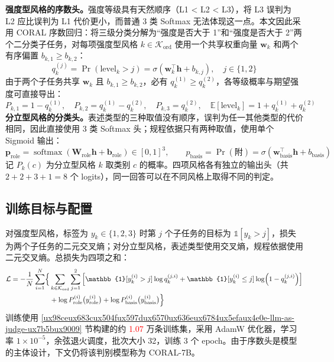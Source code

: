 \documentclass[fontset=fandol,type=master,campus=shenzhen,etitleauto=true]{hithesisbook}
\newcommand{\rev}[1]{\textcolor{red}{#1}}
\begin{document}
\textbf{强度型风格的序数头。}强度等级具有天然顺序（L1 < L2 < L3），将 L3 误判为 L2 应比误判为 L1 代价更小，而普通 3 类 Softmax 无法体现这一点。本文因此采用 CORAL 序数回归\cite{ref86}：将三级分类分解为“强度是否大于 1”和“强度是否大于 2”两个二分类子任务，对每项强度型风格 $k \in \mathcal{K}_{\text{ord}}$ 使用一个共享权重向量 $\mathbf{w}_k$ 和两个有序偏置 $b_{k,1} \ge b_{k,2}$：
\begin{equation}
q_k^{(j)} = \Pr(\text{level}_k > j) = \sigma\!\left(\mathbf{w}_k^{\top}\mathbf{h} + b_{k,j}\right), \quad j \in \{1, 2\}
\end{equation}
由于两个子任务共享 $\mathbf{w}_k$ 且 $b_{k,1} \ge b_{k,2}$，必有 $q_k^{(1)} \ge q_k^{(2)}$，各等级概率与期望强度可直接导出：
\begin{equation}
P_{k,1} = 1 - q_k^{(1)}, \quad P_{k,2} = q_k^{(1)} - q_k^{(2)}, \quad P_{k,3} = q_k^{(2)}, \quad \mathbb{E}[\text{level}_k] = 1 + q_k^{(1)} + q_k^{(2)}
\end{equation}
\textbf{分立型风格的分类头。}表述类型的三种取值没有顺序，误判为任一其他类型的代价相同，因此直接使用 3 类 Softmax 头；规程依据只有两种取值，使用单个 Sigmoid 输出：
\begin{equation}
\mathbf{p}_{\text{role}} = \operatorname{softmax}\!\left(\mathbf{W}_{\text{role}}\mathbf{h} + \mathbf{b}_{\text{role}}\right) \in [0,1]^{3}, \qquad p_{\text{basis}} = \Pr(\text{附}) = \sigma\!\left(\mathbf{w}_{\text{basis}}^{\top}\mathbf{h} + b_{\text{basis}}\right)
\end{equation}
记 $P_k(c)$ 为分立型风格 $k$ 取类别 $c$ 的概率。四项风格各有独立的输出头（共 $2 + 2 + 3 + 1 = 8$ 个 logits），同一回答可以在不同风格上取得不同的判定。

\subsection{训练目标与配置}\label{ux8badux7ec3ux76eeux6807ux4e0eux4f18ux5316ux914dux7f6e-1}

对强度型风格，标签为 $y_k \in \{1,2,3\}$ 时第 $j$ 个子任务的目标为 $\mathbb{1}[y_k > j]$，损失为两个子任务的二元交叉熵；对分立型风格，表述类型使用交叉熵，规程依据使用二元交叉熵。总损失为四项之和：
\begin{equation}
\begin{aligned}
\mathcal{L} = -\frac{1}{N}\sum_{i=1}^{N} \Bigl\{ &\sum_{k \in \mathcal{K}_{\text{ord}}} \sum_{j=1}^{2} \left[ \mathbb{1}[y_k^{(i)} > j] \log q_k^{(j,i)} + \mathbb{1}[y_k^{(i)} \le j] \log\!\left(1 - q_k^{(j,i)}\right) \right] \\
&+ \log P^{(i)}_{\text{role}}\bigl(y^{(i)}_{\text{role}}\bigr) + \log P^{(i)}_{\text{basis}}\bigl(y^{(i)}_{\text{basis}}\bigr) \Bigr\}
\end{aligned}
\end{equation}
训练使用 \ref{ux98ceux683cux504fux597dux6570ux636eux6784ux5efaux4e0e-llm-as-judge-ux7b5bux9009} 节构建的约 \rev{1.07} 万条训练集，采用 AdamW 优化器，学习率 $1 \times 10^{-5}$，余弦退火调度，批次大小 32，训练 3 个 epoch。由于序数头是模型的主体设计，下文仍将该判别模型称为 CORAL-7B。
\end{document}
